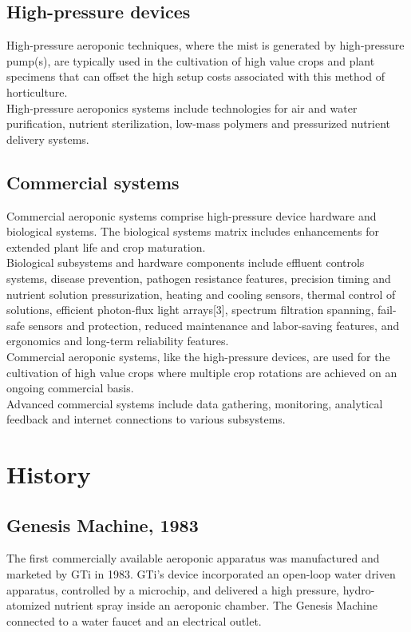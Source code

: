 \documentclass{article}
\begin{document}
\subsection{High-pressure devices}
High-pressure aeroponic techniques, where the mist is generated by high-pressure pump(s), are typically used in the cultivation of high value crops and plant specimens that can offset the high setup costs associated with this method of horticulture.\\
High-pressure aeroponics systems include technologies for air and water purification, nutrient sterilization, low-mass polymers and pressurized nutrient delivery systems.
\subsection{Commercial systems}
Commercial aeroponic systems comprise high-pressure device hardware and biological systems. The biological systems matrix includes enhancements for extended plant life and crop maturation.\\
Biological subsystems and hardware components include effluent controls systems, disease prevention, pathogen resistance features, precision timing and nutrient solution pressurization, heating and cooling sensors, thermal control of solutions, efficient photon-flux light arrays[3], spectrum filtration spanning, fail-safe sensors and protection, reduced maintenance and labor-saving features, and ergonomics and long-term reliability features.\\
Commercial aeroponic systems, like the high-pressure devices, are used for the cultivation of high value crops where multiple crop rotations are achieved on an ongoing commercial basis.\\
Advanced commercial systems include data gathering, monitoring, analytical feedback and internet connections to various subsystems.
\section{History}
\subsection{Genesis Machine, 1983}
The first commercially available aeroponic apparatus was manufactured and marketed by GTi in 1983. GTi's device incorporated an open-loop water driven apparatus, controlled by a microchip, and delivered a high pressure, hydro-atomized nutrient spray inside an aeroponic chamber. The Genesis Machine connected to a water faucet and an electrical outlet.
\end{document}
